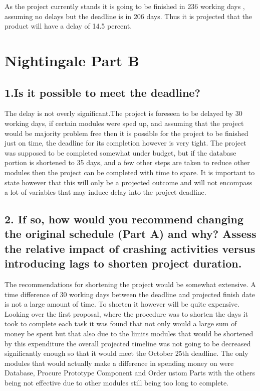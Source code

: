 \documentclass{article}
\begin{document}
As the project currently stands it is going to be finished in 236 working days , assuming no delays but the deadline is in 206 days. Thus it is projected that the product will have a delay of 14.5 percent.











\section{Nightingale Part B}

\subsection{1.Is it possible to meet the deadline?}



The delay is not overly significant.The project is foreseen to be delayed by 30 working days, if certain modules were sped up, and assuming that the project would be majority problem free then it is possible for the project to be finished just on time, the deadline for its completion however is very tight.
The project was supposed to be completed somewhat under budget, but if the database portion is shortened to 35 days, and a few other steps are taken to reduce other modules then the project can be completed with time to spare.
It is important to state however that this will only be a projected outcome and will not encompass a lot of variables that may induce delay into the project deadline.






\subsection{ 2. If so, how would you recommend changing the original schedule (Part A) and why? Assess the relative impact of crashing activities versus introducing lags to shorten project duration. }




The recommendations for shortening the project would be somewhat extensive. A time difference of 30 working days between the deadline and projected finish date is not a large amount of time. To shorten it however will be quite expensive.
Looking over the first proposal, where the procedure was to shorten the days it took to complete each task it was found that not only would a large sum of money be spent but that also due to the limits modules that would be shortened by this expenditure the overall projected timeline was not going to be decreased significantly enough so that it would meet the October 25th deadline. The only modules that would actually make a difference in spending money on were Database, Procure Prototype Component and Order ustom Parts with the others being not effective due to other modules still being too long to complete.
\end{document}
